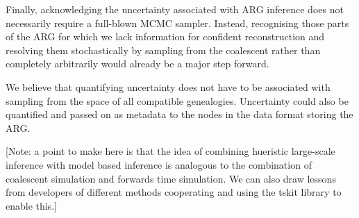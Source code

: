 \documentclass{article}
\newcommand{\kwarg}[0]{\texttt{KwARG}}
\newcommand{\argweaver}[0]{\texttt{ARGweaver}}
\begin{document}
Finally, acknowledging the uncertainty associated with ARG inference does not
necessarily require a full-blown MCMC sampler. Instead, recognising those parts of
the ARG for which we lack information for confident reconstruction and resolving
them stochastically by sampling from the coalescent rather than completely arbitrarily
would already be a major step forward. 

We believe that quantifying uncertainty does not have to be associated with sampling
from the space of all compatible genealogies. Uncertainty could also
be quantified and passed on as metadata to the nodes in the data format storing the ARG.

[Note: a point to make here is that the idea of combining hueristic large-scale 
inference with model based inference is analogous to the combination of 
coalescent simulation and forwards time simulation. We can also draw lessons
from developers of different methods cooperating and using the tskit library
to enable this.]


\end{document}
